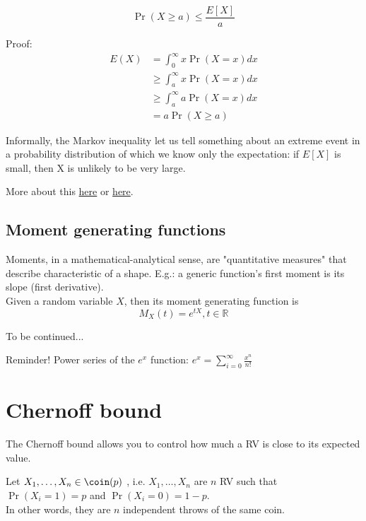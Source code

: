 	\begin{equation}
	\Pr(X \geq a) \leq \frac{E[X]}{a}
	\end{equation}
	
	Proof:
	\begin{align*}
	E(X) &= \int_{0}^{\infty}x \Pr(X=x)dx \\
		 &\geq \int_{a}^{\infty}x\Pr(X=x)dx \\
		 &\geq \int_{a}^{\infty}a\Pr(X=x)dx \\
		 &= a\Pr(X \geq a)
	\end{align*}
	
	Informally, the Markov inequality let us tell something about an extreme event in a probability distribution of which we know only the expectation: if $E[X]$ is small, then X is unlikely to be very large.
	
	More about this \href{https://youtu.be/vjYanZ1nsZg}{here} or \href{https://ocw.mit.edu/resources/res-6-012-introduction-to-probability-spring-2018/part-i-the-fundamentals/}{here}.


\subsection{Moment generating functions}
	
	Moments, in a mathematical-analytical sense, are "quantitative measures" that describe characteristic of a shape. E.g.: a generic function's first moment is its slope (first derivative).\\
	Given a random variable $X$, then its moment generating function is
	\begin{equation}
	M_X(t) = e^{tX}, t \in \mathbb{R}
	\end{equation}
	
	To be continued... %
	
	Reminder! Power series of the $e^x$ function: $\displaystyle e^x = \sum_{i=0}^{\infty}\frac{x^n}{n!}$
	
	
\section{Chernoff bound}

	The Chernoff bound allows you to control how much a RV is close to its expected value.

	Let $X_1, \dots, X_n \in \coin(p)$ \iid, i.e. $X_1, \dots, X_n$ are $n$ RV such that\\
	$\Pr(X_i=1)=p$ and $\Pr(X_i=0)=1-p$.\\
	In other words, they are $n$ independent throws of the same coin.
	
